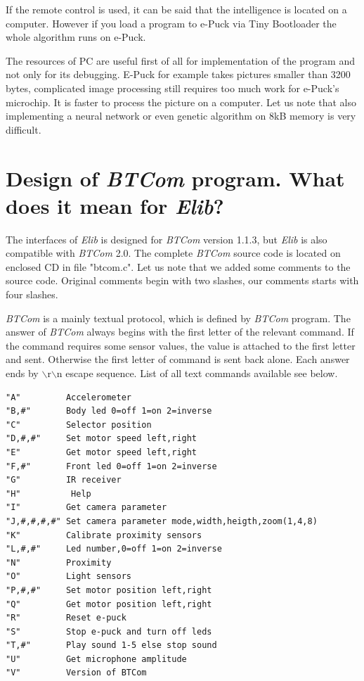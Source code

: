 \documentclass[12pt,notitlepage]{report}
\begin{document}
	If the remote control is used, it can be said that the intelligence 
	is located on a computer. However if you load a program to e-Puck via Tiny Bootloader the whole algorithm
	runs on e-Puck.
	 
	The resources of PC are useful first of all for implementation of the program and not only for
	its debugging. E-Puck for example takes pictures smaller than 3200 bytes, complicated image processing still
	requires too much work for e-Puck's microchip. It is faster to process the picture
	on a computer. Let us note that also implementing a neural network or even genetic algorithm on 8kB memory
	is very difficult.
\section{Design of {\it BTCom} program. What does it mean for {\it Elib}?}
	\label{sec:btcomdesign}
	The interfaces of {\it Elib} is designed for {\it BTCom} version 1.1.3, but {\it Elib} is also compatible with {\it BTCom} 2.0.
	The complete {\it BTCom} source code is located on enclosed CD in file "btcom.c".
	Let us note that we added some comments to the source code. Original comments begin with two slashes,
	our comments starts with four slashes.

	{\it BTCom} is a mainly textual protocol, which is defined by {\it BTCom} program. The answer of {\it BTCom} always begins 
	with the first letter of the relevant command.
	If the command requires some sensor values, the value is attached to the first letter and
	sent. Otherwise the first letter of command is sent back alone. Each answer ends by 
	$\backslash$r$\backslash$n escape sequence.
	List of all text commands available see below.
	\lstset{basicstyle=\small}
\begin{lstlisting}
"A"         Accelerometer
"B,#"       Body led 0=off 1=on 2=inverse
"C"         Selector position
"D,#,#"     Set motor speed left,right
"E"         Get motor speed left,right
"F,#"       Front led 0=off 1=on 2=inverse
"G"         IR receiver
"H"          Help
"I"         Get camera parameter
"J,#,#,#,#" Set camera parameter mode,width,heigth,zoom(1,4,8)
"K"         Calibrate proximity sensors
"L,#,#"     Led number,0=off 1=on 2=inverse
"N"         Proximity
"O"         Light sensors
"P,#,#"     Set motor position left,right
"Q"         Get motor position left,right
"R"         Reset e-puck
"S"         Stop e-puck and turn off leds
"T,#"       Play sound 1-5 else stop sound
"U"         Get microphone amplitude
"V"         Version of BTCom
\end{lstlisting}
	  
\end{document}
